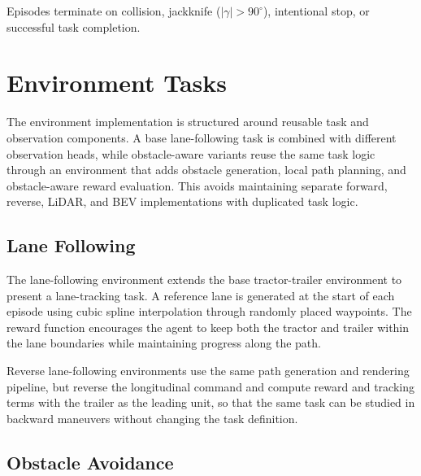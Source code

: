 Episodes terminate on collision, jackknife ($|\gamma| > 90^\circ$), intentional stop, or successful task completion.

\section{Environment Tasks}

The environment implementation is structured around reusable task and observation components. A base lane-following task is combined with different observation heads, while obstacle-aware variants reuse the same task logic through an environment that adds obstacle generation, local path planning, and obstacle-aware reward evaluation. This avoids maintaining separate forward, reverse, LiDAR, and BEV implementations with duplicated task logic.

\subsection{Lane Following}

The lane-following environment extends the base tractor-trailer environment to present a lane-tracking task. A reference lane is generated at the start of each episode using cubic spline interpolation through randomly placed waypoints. The reward function encourages the agent to keep both the tractor and trailer within the lane boundaries while maintaining progress along the path.

Reverse lane-following environments use the same path generation and rendering pipeline, but reverse the longitudinal command and compute reward and tracking terms with the trailer as the leading unit, so that the same task can be studied in backward maneuvers without changing the task definition.

\subsection{Obstacle Avoidance}

